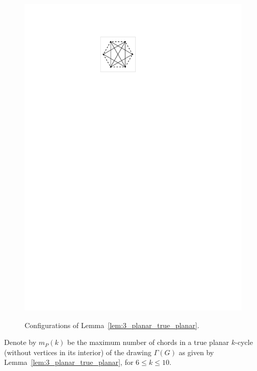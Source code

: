 \begin{figure}[htb]
\begin{minipage}[b]{.24\textwidth}
        \includegraphics[width=\textwidth,page=7]{images/polygon_conf}
        \subcaption{~}\label{fig:3_planar_polygon_conf_8_stick}
    \end{minipage}
    \caption{%
    Configurations of Lemma~\ref{lem:3_planar_true_planar}.
    \label{fig:3_planar_polygon_conf}}
\end{figure}

Denote by $m_P(k)$ be the maximum number of chords in a true planar $k$-cycle (without vertices in its interior) of the drawing $\Gamma(G)$ as given by Lemma~\ref{lem:3_planar_true_planar}, for $6\leq k\leq 10$. 

